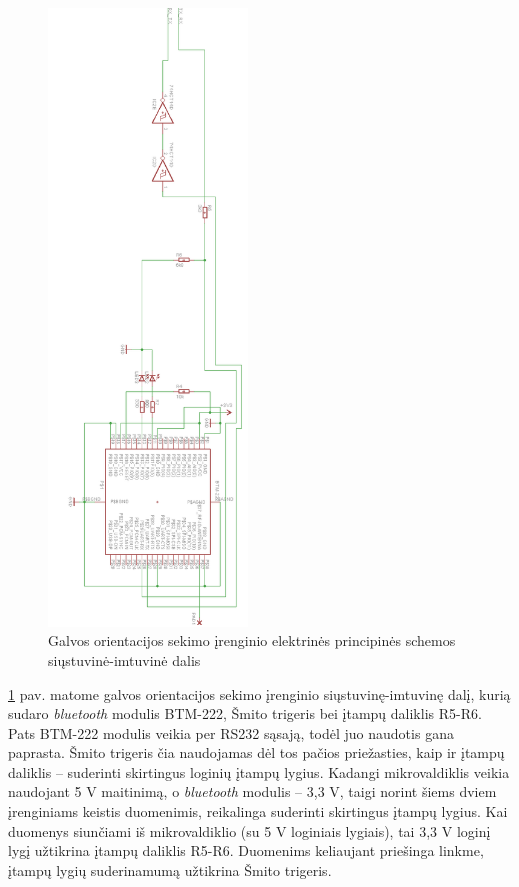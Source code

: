 \documentclass[]{vgtuef}
\begin{document}
{\begin{figure}[htbp]
  \centering
  \includegraphics[width=200px]{img/head_tracker_sender.png}
  \caption{Galvos orientacijos sekimo įrenginio elektrinės principinės schemos siųstuvinė-imtuvinė dalis}
  \label{fig:headtracker_sender}
\end{figure}

\ref{fig:headtracker_sender} pav. matome galvos orientacijos sekimo įrenginio siųstuvinę-imtuvinę dalį, kurią sudaro \textit{bluetooth} modulis BTM-222, Šmito trigeris bei įtampų daliklis R5-R6. Pats BTM-222 modulis veikia per RS232 sąsają, todėl juo naudotis gana paprasta. Šmito trigeris čia naudojamas dėl tos pačios priežasties, kaip ir įtampų daliklis – suderinti skirtingus loginių įtampų lygius. Kadangi mikrovaldiklis veikia naudojant 5 V maitinimą, o \textit{bluetooth} modulis – 3,3 V, taigi norint šiems dviem įrenginiams keistis duomenimis, reikalinga suderinti skirtingus įtampų lygius. Kai duomenys siunčiami iš mikrovaldiklio (su 5 V loginiais lygiais), tai 3,3 V loginį lygį užtikrina įtampų daliklis R5-R6. Duomenims keliaujant priešinga linkme, įtampų lygių suderinamumą užtikrina Šmito trigeris.

}
\end{document}
